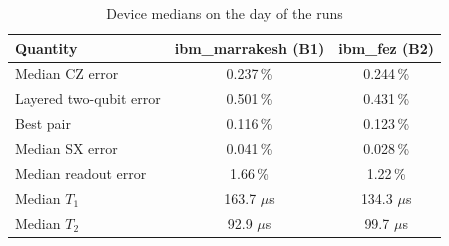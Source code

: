 \documentclass[journal]{IEEEtran}
\begin{document}
\begin{table}[h]
\caption{Device medians on the day of the runs}
\label{tab:calib}
\centering
\footnotesize
\begin{tabular}{lcc}
\hline \hline
\textbf{Quantity} & \textbf{ibm\_marrakesh (B1)} & \textbf{ibm\_fez (B2)} \\
\hline
Median CZ error & 0.237\,\% & 0.244\,\% \\
Layered two-qubit error & 0.501\,\% & 0.431\,\% \\
Best pair & 0.116\,\% & 0.123\,\% \\
Median SX error & 0.041\,\% & 0.028\,\% \\
Median readout error & 1.66\,\% & 1.22\,\% \\
Median $T_{1}$ & 163.7 $\mu$s & 134.3 $\mu$s \\
Median $T_{2}$ & 92.9 $\mu$s & 99.7 $\mu$s \\
\hline \hline
\end{tabular}
\end{table}
\end{document}
